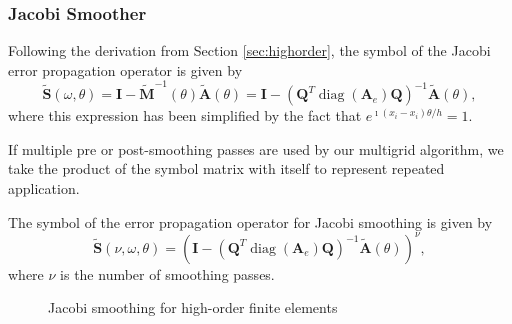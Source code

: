 \documentclass[review]{siamart190516}
\DeclareMathOperator{\diag}{diag}
\begin{document}
\subsubsection{Jacobi Smoother}\label{sec:jacobi}

Following the derivation from Section \ref{sec:highorder}, the symbol of the Jacobi error propagation operator is given by
\begin{equation}
\tilde{\mathbf{S}} \left( \omega, \theta \right) = \mathbf{I} - \tilde{\mathbf{M}}^{-1} \left( \theta \right) \tilde{\mathbf{A}} \left( \theta \right) = \mathbf{I} - \left( \mathbf{Q}^T \diag \left( \mathbf{A}_e \right) \mathbf{Q} \right)^{-1} \tilde{\mathbf{A}} \left( \theta \right),
\end{equation}
where this expression has been simplified by the fact that $e^{\imath \left( x_i - x_i \right) \theta / h} = 1$.

If multiple pre or post-smoothing passes are used by our multigrid algorithm, we take the product of the symbol matrix with itself to represent repeated application.

\begin{definition}
The symbol of the error propagation operator for Jacobi smoothing is given by
\begin{equation}
\tilde{\mathbf{S}} \left( \nu, \omega, \theta \right) = \left( \mathbf{I} - \left( \mathbf{Q}^T \diag \left( \mathbf{A}_e \right) \mathbf{Q} \right)^{-1} \tilde{\mathbf{A}} \left( \theta \right) \right)^\nu,
\end{equation}
where $\nu$ is the number of smoothing passes.
\end{definition}\label{def:jacobi_symbol}

\begin{figure}[!tbp]
  \centering
  \hfill
  \caption{Jacobi smoothing for high-order finite elements}
\end{figure}
\end{document}
